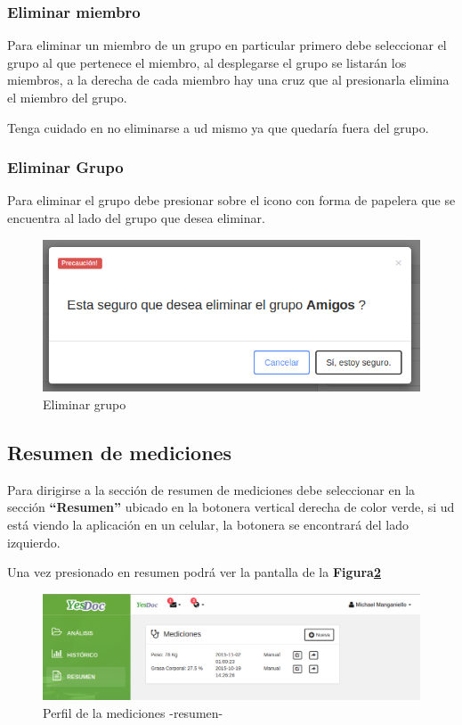 \subsubsection{Eliminar miembro}
Para eliminar un miembro de un grupo en particular primero debe seleccionar el grupo al que pertenece el miembro, al desplegarse el grupo se listarán los miembros, a la derecha de cada miembro hay una cruz que al presionarla elimina el miembro del grupo.

Tenga cuidado en no eliminarse a ud mismo ya que quedaría fuera del grupo.

\subsubsection{Eliminar Grupo}

Para eliminar el grupo debe presionar sobre el icono con forma de papelera que se encuentra al lado del grupo que desea eliminar.
    \begin{figure}
    	\centering
    	\includegraphics[width=.8\textwidth]{img/manual_de_usuario/eliminar_grupo}
    	\caption{Eliminar grupo}
    	\label{mu-eliminar_grupo}
    \end{figure}
    
    
    
    
    
\subsection{Resumen de mediciones}    
Para dirigirse a la sección de resumen de mediciones debe seleccionar en la sección \textbf{``Resumen''} ubicado en la botonera vertical derecha de color verde, si ud está viendo la aplicación en un celular, la botonera se encontrará del lado izquierdo.

Una vez presionado en resumen podrá ver la pantalla de la \textbf{Figura\ref{mu-resumen_medicion}}
 

    \begin{figure}
    	\centering
    	\includegraphics[width=.8\textwidth]{img/manual_de_usuario/resumen_medicion}
    	\caption{Perfil de la mediciones -resumen-}
    	\label{mu-resumen_medicion}
    \end{figure}


